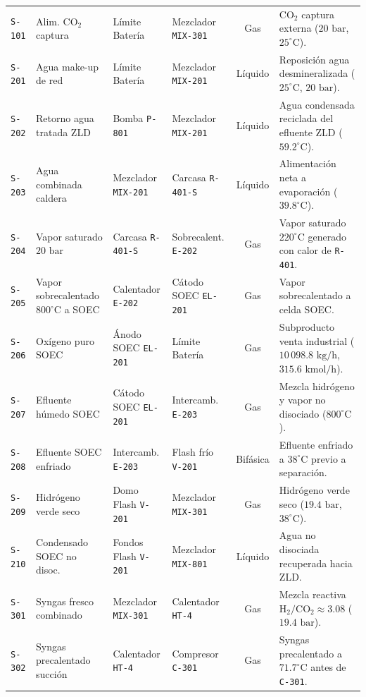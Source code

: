 \documentclass[11pt,letterpaper]{article}
\begin{document}
\begin{xltabular}{\textwidth}{l p{3.1cm} p{2.5cm} p{2.5cm} c X}
\texttt{S-101} & Alim. $\text{CO}_2$ captura & Límite Batería & Mezclador \texttt{MIX-301} & Gas & $\text{CO}_2$ captura externa ($20\text{ bar}$, $25^\circ\text{C}$). \\
\texttt{S-201} & Agua make-up de red & Límite Batería & Mezclador \texttt{MIX-201} & Líquido & Reposición agua desmineralizada ($25^\circ\text{C}$, $20\text{ bar}$). \\
\texttt{S-202} & Retorno agua tratada ZLD & Bomba \texttt{P-801} & Mezclador \texttt{MIX-201} & Líquido & Agua condensada reciclada del efluente ZLD ($59.2^\circ\text{C}$). \\
\texttt{S-203} & Agua combinada caldera & Mezclador \texttt{MIX-201} & Carcasa \texttt{R-401-S} & Líquido & Alimentación neta a evaporación ($39.8^\circ\text{C}$). \\
\texttt{S-204} & Vapor saturado $20\text{ bar}$ & Carcasa \texttt{R-401-S} & Sobrecalent. \texttt{E-202} & Gas & Vapor saturado $220^\circ\text{C}$ generado con calor de \texttt{R-401}. \\
\texttt{S-205} & Vapor sobrecalentado $800^\circ\text{C}$ a SOEC & Calentador \texttt{E-202} & Cátodo SOEC \texttt{EL-201} & Gas & Vapor sobrecalentado a celda SOEC. \\
\texttt{S-206} & Oxígeno puro SOEC & Ánodo SOEC \texttt{EL-201} & Límite Batería & Gas & Subproducto venta industrial ($10\,098.8\text{ kg/h}$, $315.6\text{ kmol/h}$). \\
\texttt{S-207} & Efluente húmedo SOEC & Cátodo SOEC \texttt{EL-201} & Intercamb. \texttt{E-203} & Gas & Mezcla hidrógeno y vapor no disociado ($800^\circ\text{C}$). \\
\texttt{S-208} & Efluente SOEC enfriado & Intercamb. \texttt{E-203} & Flash frío \texttt{V-201} & Bifásica & Efluente enfriado a $38^\circ\text{C}$ previo a separación. \\
\texttt{S-209} & Hidrógeno verde seco & Domo Flash \texttt{V-201} & Mezclador \texttt{MIX-301} & Gas & Hidrógeno verde seco ($19.4\text{ bar}$, $38^\circ\text{C}$). \\
\texttt{S-210} & Condensado SOEC no disoc. & Fondos Flash \texttt{V-201} & Mezclador \texttt{MIX-801} & Líquido & Agua no disociada recuperada hacia ZLD. \\
\texttt{S-301} & Syngas fresco combinado & Mezclador \texttt{MIX-301} & Calentador \texttt{HT-4} & Gas & Mezcla reactiva $\text{H}_2/\text{CO}_2 \approx 3.08$ ($19.4\text{ bar}$). \\
\texttt{S-302} & Syngas precalentado succión & Calentador \texttt{HT-4} & Compresor \texttt{C-301} & Gas & Syngas precalentado a $71.7^\circ\text{C}$ antes de \texttt{C-301}. \\

\end{xltabular}
\end{document}
